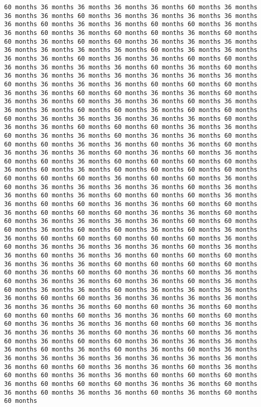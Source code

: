\documentclass[11pt]{article}
\begin{document}
\begin{Verbatim}[commandchars=\\\{\}, frame=single, framerule=2mm, rulecolor=\color{outerrorbackground}]
60 months 36 months 36 months 36 months 36 months 60 months 36 months 36 months 36 months 60 months 36 months 36 months 36 months 36 months 36 months 60 months 36 months 36 months 60 months 60 months 36 months 36 months 60 months 36 months 60 months 60 months 36 months 60 months 60 months 36 months 60 months 60 months 36 months 36 months 36 months 36 months 36 months 36 months 36 months 60 months 36 months 36 months 36 months 36 months 60 months 36 months 36 months 60 months 60 months 36 months 36 months 36 months 36 months 60 months 36 months 60 months 36 months 36 months 36 months 36 months 36 months 36 months 36 months 60 months 36 months 36 months 36 months 60 months 60 months 60 months 36 months 36 months 60 months 60 months 36 months 36 months 60 months 36 months 36 months 60 months 36 months 36 months 60 months 36 months 36 months 36 months 60 months 60 months 36 months 60 months 60 months 60 months 36 months 36 months 36 months 36 months 36 months 60 months 36 months 36 months 60 months 60 months 60 months 36 months 36 months 60 months 36 months 36 months 60 months 36 months 36 months 60 months 60 months 60 months 36 months 36 months 60 months 36 months 60 months 36 months 36 months 36 months 60 months 36 months 60 months 36 months 60 months 60 months 36 months 60 months 60 months 60 months 60 months 36 months 60 months 36 months 60 months 60 months 60 months 60 months 60 months 60 months 60 months 36 months 60 months 60 months 36 months 60 months 36 months 36 months 36 months 36 months 60 months 36 months 36 months 60 months 36 months 60 months 60 months 60 months 36 months 36 months 60 months 60 months 36 months 36 months 60 months 60 months 36 months 60 months 60 months 60 months 36 months 36 months 60 months 60 months 36 months 36 months 36 months 36 months 60 months 60 months 60 months 36 months 60 months 60 months 36 months 60 months 36 months 36 months 60 months 60 months 60 months 60 months 60 months 36 months 60 months 36 months 36 months 36 months 36 months 60 months 36 months 36 months 60 months 36 months 36 months 60 months 60 months 60 months 36 months 36 months 36 months 60 months 60 months 60 months 60 months 60 months 36 months 60 months 60 months 36 months 60 months 36 months 60 months 36 months 36 months 60 months 36 months 60 months 36 months 60 months 36 months 36 months 60 months 36 months 36 months 36 months 36 months 60 months 60 months 36 months 36 months 36 months 36 months 36 months 36 months 36 months 60 months 60 months 36 months 60 months 60 months 60 months 60 months 36 months 36 months 60 months 60 months 60 months 36 months 36 months 36 months 60 months 60 months 36 months 36 months 36 months 36 months 60 months 36 months 60 months 36 months 60 months 36 months 60 months 60 months 36 months 36 months 36 months 36 months 60 months 36 months 60 months 36 months 60 months 36 months 36 months 36 months 36 months 36 months 36 months 36 months 36 months 36 months 60 months 60 months 36 months 36 months 60 months 36 months 60 months 60 months 36 months 36 months 60 months 60 months 60 months 36 months 60 months 60 months 60 months 36 months 36 months 60 months 36 months 60 months 36 months 36 months 60 months 36 months 60 months 60 months 
\end{Verbatim}
\end{document}
